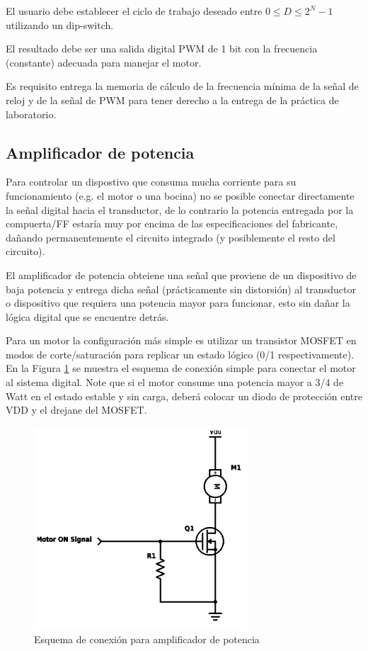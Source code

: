 El usuario debe establecer el ciclo de trabajo deseado entre $0 \leq D \leq 2^{N}-1$ utilizando un dip-switch.

El resultado debe ser una salida digital PWM de 1 bit con la frecuencia (constante) adecuada para manejar el motor.

Es requisito entrega la memoria de cálculo de la frecuencia mínima de la señal de reloj y de la señal de PWM para tener derecho a la entrega de la práctica de laboratorio.

\subsection{Amplificador de potencia}
Para controlar un dispostivo que consuma mucha corriente para su funcionamiento (e.g. el motor o una bocina) no se posible conectar directamente la 
señal digital hacia el transductor, de lo contrario la potencia entregada por la compuerta/FF estaría muy por encima de las especificaciones del fabricante,
dañando permanentemente el circuito integrado (y posiblemente el resto del circuito).

El amplificador de potencia obteiene una señal que proviene de un dispositivo de baja potencia y entrega dicha señal (prácticamente sin distorsión) al transductor
o dispositivo que requiera una potencia mayor para funcionar, esto sin dañar la lógica digital que se encuentre detrás.

Para un motor la configuración más simple es utilizar un transistor MOSFET en modos de corte/saturación para replicar un estado lógico (0/1 respectivamente). 
En la Figura \ref{Fig:MOSFETDRIVER} se muestra el esquema de conexión simple para conectar el motor al sistema digital. Note que si el motor consume una potencia mayor a 
3/4 de Watt en el estado estable y sin carga, deberá colocar un diodo de protección entre VDD y el drejane del MOSFET.


\begin{figure}[H]
    \centering
    \includegraphics[scale=0.8]{images/motorMOSFET.png}
    \caption{Esquema de conexión para amplificador de potencia}
    \label{Fig:MOSFETDRIVER}
\end{figure}

